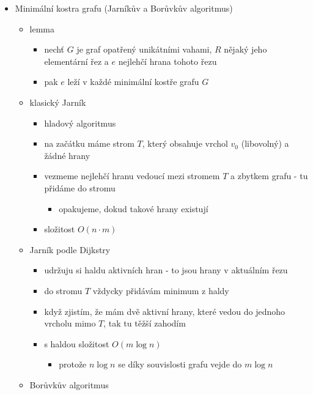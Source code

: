 \begin{itemize}
\begin{itemize}
\begin{itemize}
\item invariant: na konci fáze $F_i$ odpovídá $h(v)$ délce nejkratšího $v_0v$-sledu o nejvýše $i$ hranách
\item z toho vyplývá složitost $\Theta(n\cdot m)$
\end{itemize}
\end{itemize}
\item Minimální kostra grafu (Jarníkův a Borůvkův algoritmus)
\begin{itemize}
\item lemma
\begin{itemize}
\item nechť $G$ je graf opatřený unikátními vahami, $R$ nějaký jeho elementární řez a $e$ nejlehčí hrana tohoto řezu
\item pak $e$ leží v každé minimální kostře grafu $G$
\end{itemize}
\item klasický Jarník
\begin{itemize}
\item hladový algoritmus
\item na začátku máme strom $T$, který obsahuje vrchol $v_0$ (libovolný) a žádné hrany
\item vezmeme nejlehčí hranu vedoucí mezi stromem $T$ a zbytkem grafu - tu přidáme do stromu
\begin{itemize}
\item opakujeme, dokud takové hrany existují
\end{itemize}
\item složitost $O(n\cdot m)$
\end{itemize}
\item Jarník podle Dijkstry
\begin{itemize}
\item udržuju si haldu aktivních hran - to jsou hrany v aktuálním řezu
\item do stromu $T$ vždycky přidávám minimum z haldy
\item když zjistím, že mám dvě aktivní hrany, které vedou do jednoho vrcholu mimo $T$, tak tu těžší zahodím
\item s haldou složitost $O(m\log n)$
\begin{itemize}
\item protože $n\log n$ se díky souvislosti grafu vejde do $m\log n$
\end{itemize}
\end{itemize}
\item Borůvkův algoritmus
\begin{itemize}

\end{itemize}
\end{itemize}
\end{itemize}
